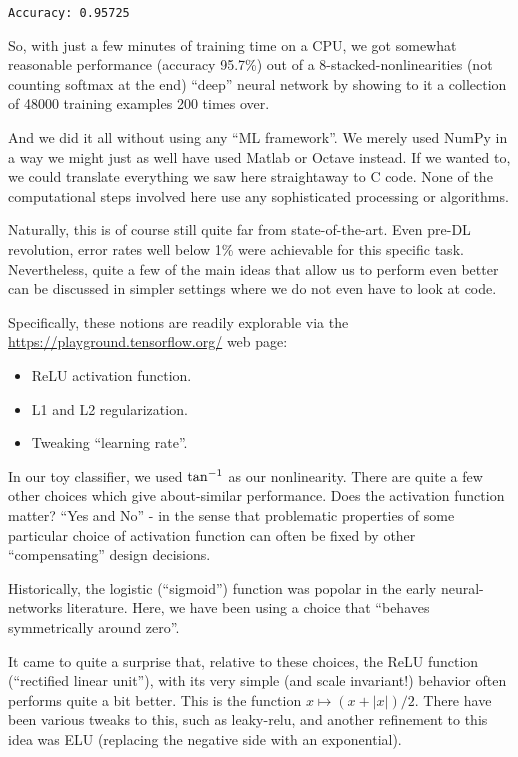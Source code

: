 \documentclass[11pt]{article}
\providecommand{\tightlist}{%
      \setlength{\itemsep}{0pt}\setlength{\parskip}{0pt}}
\begin{document}
    \begin{Verbatim}[commandchars=\\\{\}]
Accuracy: 0.95725
    \end{Verbatim}

    So, with just a few minutes of training time on a CPU, we got somewhat
reasonable performance (accuracy 95.7\%) out of a
8-stacked-nonlinearities (not counting softmax at the end) ``deep''
neural network by showing to it a collection of 48000 training examples
200 times over.

And we did it all without using any ``ML framework''. We merely used
NumPy in a way we might just as well have used Matlab or Octave instead.
If we wanted to, we could translate everything we saw here straightaway
to C code. None of the computational steps involved here use any
sophisticated processing or algorithms.

Naturally, this is of course still quite far from state-of-the-art. Even
pre-DL revolution, error rates well below 1\% were achievable for this
specific task. Nevertheless, quite a few of the main ideas that allow us
to perform even better can be discussed in simpler settings where we do
not even have to look at code.

Specifically, these notions are readily explorable via the
\url{https://playground.tensorflow.org/} web page:

\begin{itemize}
\tightlist
\item
  ReLU activation function.
\item
  L1 and L2 regularization.
\item
  Tweaking ``learning rate''.
\end{itemize}

In our toy classifier, we used \({\rm tan}^{-1}\) as our nonlinearity.
There are quite a few other choices which give about-similar
performance. Does the activation function matter? ``Yes and No'' - in
the sense that problematic properties of some particular choice of
activation function can often be fixed by other ``compensating'' design
decisions.

Historically, the logistic (``sigmoid'') function was popolar in the
early neural-networks literature. Here, we have been using a choice that
``behaves symmetrically around zero''.

It came to quite a surprise that, relative to these choices, the ReLU
function (``rectified linear unit''), with its very simple (and scale
invariant!) behavior often performs quite a bit better. This is the
function \(x \mapsto (x+|x|)/2\). There have been various tweaks to
this, such as leaky-relu, and another refinement to this idea was ELU
(replacing the negative side with an exponential).
\end{document}
